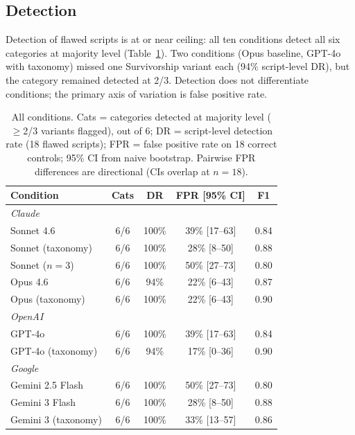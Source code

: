 \documentclass[10pt,twocolumn]{article}
\begin{document}
\subsection{Detection}

Detection of flawed scripts is at or near ceiling: all ten conditions
detect all six categories at majority level (Table~\ref{tab:main}).
Two conditions (Opus baseline, GPT-4o with taxonomy) missed one
Survivorship variant each (94\% script-level DR), but the category
remained detected at 2/3. Detection does not differentiate conditions;
the primary axis of variation is false positive rate.

\begin{table}[ht]
\centering
\caption{All conditions. Cats = categories detected at majority level
($\geq$2/3 variants flagged), out of 6; DR = script-level detection
rate (18 flawed scripts); FPR = false positive rate on 18 correct
controls; 95\% CI from naive bootstrap. Pairwise FPR differences are
directional (CIs overlap at $n{=}18$).}
\label{tab:main}
\small
\begin{tabular}{lcccc}
\toprule
\textbf{Condition} & \textbf{Cats} & \textbf{DR} & \textbf{FPR [95\% CI]} & \textbf{F1} \\
\midrule
\multicolumn{5}{l}{\textit{Claude}} \\
Sonnet 4.6           & 6/6 & 100\% & 39\% [17--63] & 0.84 \\
Sonnet (taxonomy)    & 6/6 & 100\% & 28\% [8--50]  & 0.88 \\
Sonnet ($n{=}3$)     & 6/6 & 100\% & 50\% [27--73] & 0.80 \\
Opus 4.6             & 6/6 & 94\%  & 22\% [6--43]  & 0.87 \\
Opus (taxonomy)      & 6/6 & 100\% & 22\% [6--43]  & 0.90 \\
\midrule
\multicolumn{5}{l}{\textit{OpenAI}} \\
GPT-4o               & 6/6 & 100\% & 39\% [17--63] & 0.84 \\
GPT-4o (taxonomy)    & 6/6 & 94\%  & 17\% [0--36]  & 0.90 \\
\midrule
\multicolumn{5}{l}{\textit{Google}} \\
Gemini 2.5 Flash     & 6/6 & 100\% & 50\% [27--73] & 0.80 \\
Gemini 3 Flash       & 6/6 & 100\% & 28\% [8--50]  & 0.88 \\
Gemini 3 (taxonomy)  & 6/6 & 100\% & 33\% [13--57] & 0.86 \\
\bottomrule
\end{tabular}
\end{table}
\end{document}

